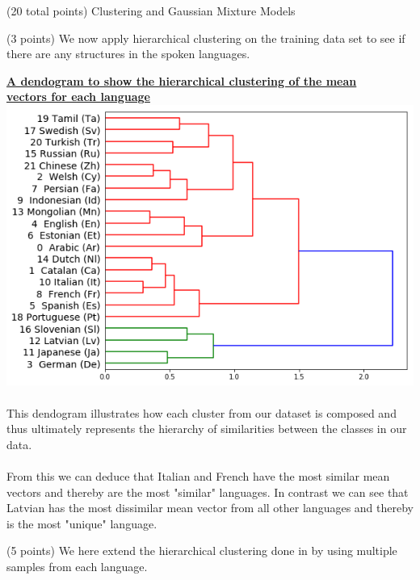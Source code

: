 \documentclass[12pt]{article}
\begin{document}
\begin{question}{(20 total points) Clustering and Gaussian Mixture Models}
\begin{subquestion}{(3 points)
       We now apply hierarchical clustering on the training data set
       to see if there are any structures in the spoken languages.
     }
     

      \begin{answerbox}{40em}
        \textbf{\large{\underline{A dendogram to show the hierarchical clustering of the mean}}}\\
        \textbf{\large{\underline{vectors for each language}}}\\
        \includegraphics[width=1\textwidth]{images/q33.png}
        \\
        \\
        This dendogram illustrates how each cluster from our dataset is composed and thus ultimately represents the hierarchy of similarities between the classes in our data.\\
        \\
        From this we can deduce that Italian and French have the most similar mean vectors and thereby are the most "similar" languages. In contrast we can see that Latvian has the most dissimilar mean vector from all other languages and thereby is the most "unique" language.
      \end{answerbox}
  


   \end{subquestion}
   \begin{subquestion}{(5 points)
       We here extend the hierarchical clustering done in  by
       using multiple samples from each language.
     } \label{Q3.4}


   


\end{subquestion}
\end{question}
\end{document}
